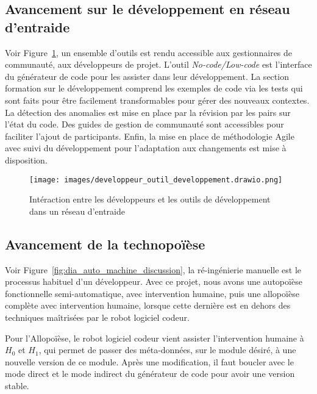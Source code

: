 \subsection{Avancement sur le développement en réseau d'entraide}

Voir Figure~\ref{fig:dia_outil_dev_reseau_entraide}, un ensemble d'outils est rendu accessible aux gestionnaires de communauté, aux développeurs de projet. L'outil \textit{No-code/Low-code} est l'interface du générateur de code pour les assister dans leur développement. La section formation sur le développement comprend les exemples de code via les tests qui sont faits pour être facilement transformables pour gérer des nouveaux contextes. La détection des anomalies est mise en place par la révision par les pairs sur l'état du code. Des guides de gestion de communauté sont accessibles pour faciliter l'ajout de participants. Enfin, la mise en place de méthodologie Agile avec suivi du développement pour l'adaptation aux changements est mise à disposition.

\begin{figure}
\centering
\texttt{[image: images/developpeur\_outil\_developpement.drawio.png]}
\caption{Intéraction entre les développeurs et les outils de développement dans un réseau d'entraide}
\label{fig:dia_outil_dev_reseau_entraide}
\end{figure}

\subsection{Avancement de la technopoïèse}\label{avancement_technopoiese}
Voir Figure~\ref{fig:dia_auto_machine_discussion}, la ré-ingénierie manuelle est le processus habituel d'un développeur. Avec ce projet, nous avons une autopoïèse fonctionnelle semi-automatique, avec intervention humaine, puis une allopoïèse complète avec intervention humaine, lorsque cette dernière est en dehors des techniques maîtrisées par le robot logiciel codeur.

Pour l'Allopoïèse, le robot logiciel codeur vient assister l'intervention humaine à $H_0$ et $H_1$, qui permet de passer des méta-données, sur le module désiré, à une nouvelle version de ce module. Après une modification, il faut boucler avec le mode direct et le mode indirect du générateur de code pour avoir une version stable.

